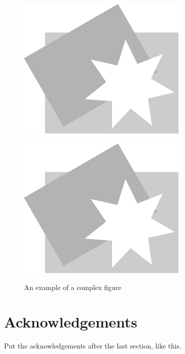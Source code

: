 \documentclass{superfri}
\begin{document}
\begin{figure}[!ht]
	\begin{minipage}{.5\linewidth}
		\centering
		\includegraphics[width=0.65\linewidth]{pic/pic}
		\label{subfig:a}
	\end{minipage}
	\begin{minipage}{.5\linewidth}
		\centering
		\includegraphics[width=0.65\linewidth]{pic/pic}
		\label{subfig:b}
	\end{minipage}
	\vspace{3pt}
	\caption{An example of a complex figure}
	\label{fig:fig}
\end{figure}



\section*{Acknowledgements}
Put the acknowledgements after the last section, like this.

\openaccess


\end{document}
